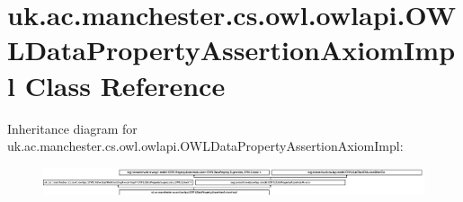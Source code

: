 \hypertarget{classuk_1_1ac_1_1manchester_1_1cs_1_1owl_1_1owlapi_1_1_o_w_l_data_property_assertion_axiom_impl}{\section{uk.\-ac.\-manchester.\-cs.\-owl.\-owlapi.\-O\-W\-L\-Data\-Property\-Assertion\-Axiom\-Impl Class Reference}
\label{classuk_1_1ac_1_1manchester_1_1cs_1_1owl_1_1owlapi_1_1_o_w_l_data_property_assertion_axiom_impl}
}
Inheritance diagram for uk.\-ac.\-manchester.\-cs.\-owl.\-owlapi.\-O\-W\-L\-Data\-Property\-Assertion\-Axiom\-Impl\-:\begin{figure}[H]
\begin{center}
\leavevmode
\includegraphics[height=0.819912cm]{classuk_1_1ac_1_1manchester_1_1cs_1_1owl_1_1owlapi_1_1_o_w_l_data_property_assertion_axiom_impl}
\end{center}
\end{figure}
